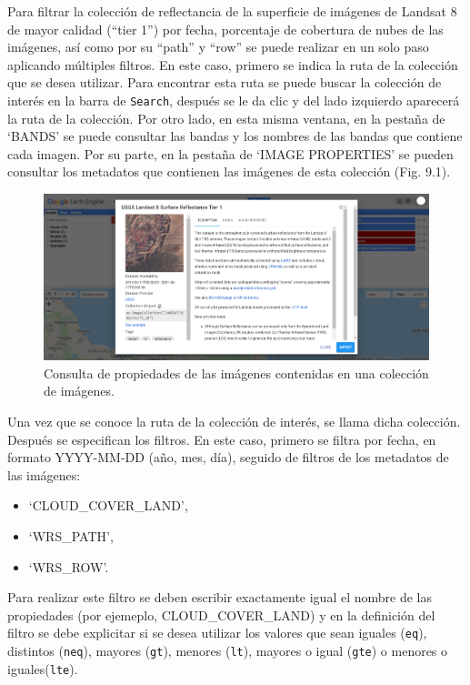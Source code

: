 \documentclass[
  12pt,
  letterpaper,
  twoside]{book}
\providecommand{\tightlist}{%
  \setlength{\itemsep}{0pt}\setlength{\parskip}{0pt}}
\begin{document}
Para filtrar la colección de reflectancia de la superficie de imágenes de Landsat 8 de mayor calidad (``tier 1'') por fecha, porcentaje de cobertura de nubes de las imágenes, así como por su ``path'' y ``row'' se puede realizar en un solo paso aplicando múltiples filtros. En este caso, primero se indica la ruta de la colección que se desea utilizar. Para encontrar esta ruta se puede buscar la colección de interés en la barra de \texttt{Search}, después se le da clic y del lado izquierdo aparecerá la ruta de la colección. Por otro lado, en esta misma ventana, en la pestaña de `BANDS' se puede consultar las bandas y los nombres de las bandas que contiene cada imagen. Por su parte, en la pestaña de `IMAGE PROPERTIES' se pueden consultar los metadatos que contienen las imágenes de esta colección (Fig. 9.1).

\begin{figure}[btp]

{\centering \includegraphics[width=1\linewidth]{Img/Ruta_coleccion} 

}

\caption{Consulta de propiedades de las imágenes contenidas en una colección de imágenes.}\label{fig:unnamed-chunk-144}
\end{figure}

Una vez que se conoce la ruta de la colección de interés, se llama dicha colección. Después se especifican los filtros. En este caso, primero se filtra por fecha, en formato YYYY-MM-DD (año, mes, día), seguido de filtros de los metadatos de las imágenes:

\begin{itemize}
\tightlist
\item
  `CLOUD\_COVER\_LAND',
\item
  `WRS\_PATH',
\item
  `WRS\_ROW'.
\end{itemize}

Para realizar este filtro se deben escribir exactamente igual el nombre de las propiedades (por ejemeplo, CLOUD\_COVER\_LAND) y en la definición del filtro se debe explicitar si se desea utilizar los valores que sean iguales (\texttt{eq}), distintos (\texttt{neq}), mayores (\texttt{gt}), menores (\texttt{lt}), mayores o igual (\texttt{gte}) o menores o iguales(\texttt{lte}).
\end{document}
